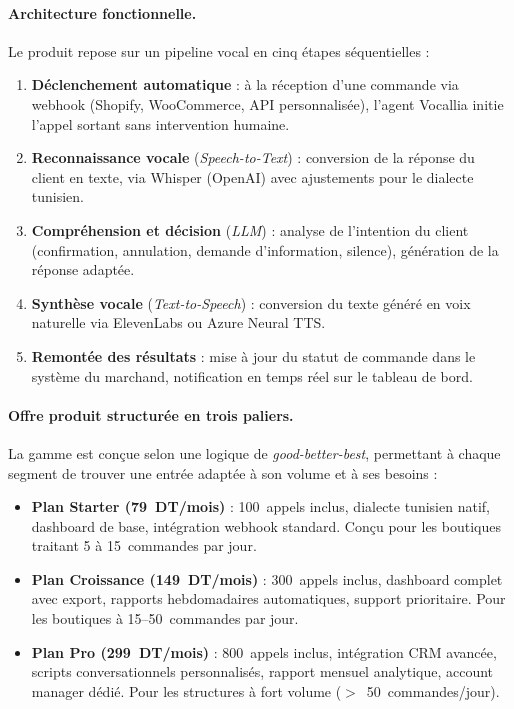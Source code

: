 \paragraph{Architecture fonctionnelle.}
Le produit repose sur un pipeline vocal en cinq étapes séquentielles :
\begin{enumerate}
    \item \textbf{Déclenchement automatique} : à la réception d'une commande via
    webhook (Shopify, WooCommerce, API personnalisée), l'agent Vocallia initie
    l'appel sortant sans intervention humaine.
    \item \textbf{Reconnaissance vocale} (\textit{Speech-to-Text}) : conversion
    de la réponse du client en texte, via Whisper (OpenAI) avec ajustements pour
    le dialecte tunisien.
    \item \textbf{Compréhension et décision} (\textit{LLM}) : analyse de
    l'intention du client (confirmation, annulation, demande d'information,
    silence), génération de la réponse adaptée.
    \item \textbf{Synthèse vocale} (\textit{Text-to-Speech}) : conversion du
    texte généré en voix naturelle via ElevenLabs ou Azure Neural TTS.
    \item \textbf{Remontée des résultats} : mise à jour du statut de commande
    dans le système du marchand, notification en temps réel sur le tableau de bord.
\end{enumerate}

\paragraph{Offre produit structurée en trois paliers.}
La gamme est conçue selon une logique de \textit{good-better-best}, permettant à
chaque segment de trouver une entrée adaptée à son volume et à ses besoins :

\begin{itemize}
    \item \textbf{Plan Starter (79~DT/mois)} : 100~appels inclus, dialecte
    tunisien natif, dashboard de base, intégration webhook standard. Conçu pour
    les boutiques traitant 5 à 15~commandes par jour.
    \item \textbf{Plan Croissance (149~DT/mois)} : 300~appels inclus, dashboard
    complet avec export, rapports hebdomadaires automatiques, support prioritaire.
    Pour les boutiques à 15--50~commandes par jour.
    \item \textbf{Plan Pro (299~DT/mois)} : 800~appels inclus, intégration CRM
    avancée, scripts conversationnels personnalisés, rapport mensuel analytique,
    account manager dédié. Pour les structures à fort volume ($>$~50~commandes/jour).
\end{itemize}

